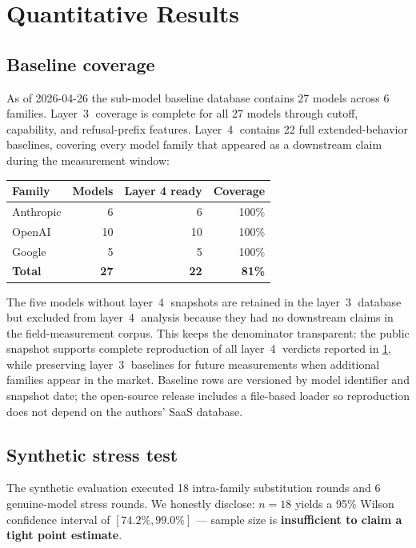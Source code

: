 \documentclass[10pt,a4paper,twocolumn]{article}
\begin{document}
\section{Quantitative Results}\label{sec:results}

\subsection{Baseline coverage}\label{sec:baseline}
As of 2026-04-26 the sub-model baseline database contains 27 models across 6
families. Layer~\textcircled{3} coverage is complete for all 27 models through
cutoff, capability, and refusal-prefix features. Layer~\textcircled{4}
contains 22 full extended-behavior baselines, covering every model family that
appeared as a downstream claim during the measurement window:

\begin{table}[h]
\centering
\small
\begin{tabular}{@{}lrrr@{}}
\toprule
Family & Models & Layer 4 ready & Coverage \\
\midrule
Anthropic & 6 & 6 & 100\% \\
OpenAI & 10 & 10 & 100\% \\
Google & 5 & 5 & 100\% \\
\midrule
\textbf{Total} & \textbf{27} & \textbf{22} & \textbf{81\%} \\
\bottomrule
\end{tabular}
\end{table}

The five models without layer~\textcircled{4} snapshots are retained in the
layer~\textcircled{3} database but excluded from layer~\textcircled{4} analysis
because they had no downstream claims in the field-measurement corpus. This
keeps the denominator transparent: the public snapshot supports complete
reproduction of all layer~\textcircled{4} verdicts reported in
\cref{sec:results}, while preserving layer~\textcircled{3} baselines for future
measurements when additional families appear in the market. Baseline rows are
versioned by model identifier and snapshot date; the open-source release
includes a file-based loader so reproduction does not depend on the authors'
SaaS database.

\subsection{Synthetic stress test}\label{sec:synthetic}
The synthetic evaluation executed 18 intra-family substitution rounds and 6
genuine-model stress rounds. We honestly disclose: $n{=}18$ yields a 95\%
Wilson confidence interval
of $[74.2\%, 99.0\%]$ --- sample size is \textbf{insufficient to claim a tight
point estimate}.
\end{document}
